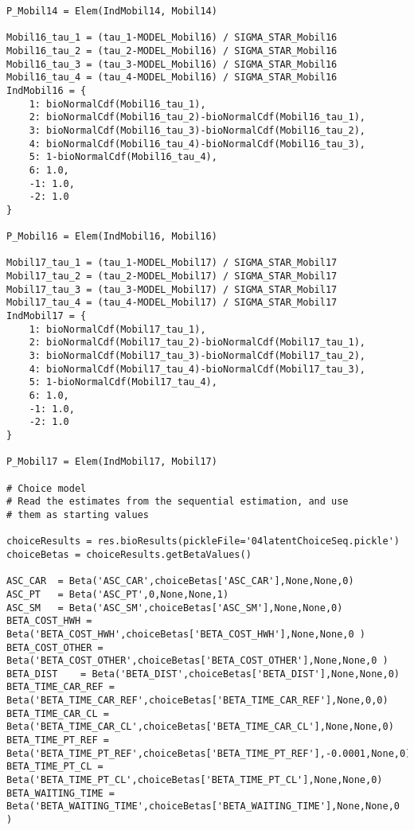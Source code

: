 \documentclass[12pt,a4paper]{article}
\begin{document}
\begin{lstlisting}[style=numbers]
P_Mobil14 = Elem(IndMobil14, Mobil14)

Mobil16_tau_1 = (tau_1-MODEL_Mobil16) / SIGMA_STAR_Mobil16
Mobil16_tau_2 = (tau_2-MODEL_Mobil16) / SIGMA_STAR_Mobil16
Mobil16_tau_3 = (tau_3-MODEL_Mobil16) / SIGMA_STAR_Mobil16
Mobil16_tau_4 = (tau_4-MODEL_Mobil16) / SIGMA_STAR_Mobil16
IndMobil16 = {
    1: bioNormalCdf(Mobil16_tau_1),
    2: bioNormalCdf(Mobil16_tau_2)-bioNormalCdf(Mobil16_tau_1),
    3: bioNormalCdf(Mobil16_tau_3)-bioNormalCdf(Mobil16_tau_2),
    4: bioNormalCdf(Mobil16_tau_4)-bioNormalCdf(Mobil16_tau_3),
    5: 1-bioNormalCdf(Mobil16_tau_4),
    6: 1.0,
    -1: 1.0,
    -2: 1.0
}

P_Mobil16 = Elem(IndMobil16, Mobil16)

Mobil17_tau_1 = (tau_1-MODEL_Mobil17) / SIGMA_STAR_Mobil17
Mobil17_tau_2 = (tau_2-MODEL_Mobil17) / SIGMA_STAR_Mobil17
Mobil17_tau_3 = (tau_3-MODEL_Mobil17) / SIGMA_STAR_Mobil17
Mobil17_tau_4 = (tau_4-MODEL_Mobil17) / SIGMA_STAR_Mobil17
IndMobil17 = {
    1: bioNormalCdf(Mobil17_tau_1),
    2: bioNormalCdf(Mobil17_tau_2)-bioNormalCdf(Mobil17_tau_1),
    3: bioNormalCdf(Mobil17_tau_3)-bioNormalCdf(Mobil17_tau_2),
    4: bioNormalCdf(Mobil17_tau_4)-bioNormalCdf(Mobil17_tau_3),
    5: 1-bioNormalCdf(Mobil17_tau_4),
    6: 1.0,
    -1: 1.0,
    -2: 1.0
}

P_Mobil17 = Elem(IndMobil17, Mobil17)

# Choice model
# Read the estimates from the sequential estimation, and use
# them as starting values

choiceResults = res.bioResults(pickleFile='04latentChoiceSeq.pickle')
choiceBetas = choiceResults.getBetaValues()

ASC_CAR	 = Beta('ASC_CAR',choiceBetas['ASC_CAR'],None,None,0)
ASC_PT	 = Beta('ASC_PT',0,None,None,1)
ASC_SM	 = Beta('ASC_SM',choiceBetas['ASC_SM'],None,None,0)
BETA_COST_HWH = Beta('BETA_COST_HWH',choiceBetas['BETA_COST_HWH'],None,None,0 )
BETA_COST_OTHER = Beta('BETA_COST_OTHER',choiceBetas['BETA_COST_OTHER'],None,None,0 )
BETA_DIST	 = Beta('BETA_DIST',choiceBetas['BETA_DIST'],None,None,0)
BETA_TIME_CAR_REF = Beta('BETA_TIME_CAR_REF',choiceBetas['BETA_TIME_CAR_REF'],None,0,0)
BETA_TIME_CAR_CL = Beta('BETA_TIME_CAR_CL',choiceBetas['BETA_TIME_CAR_CL'],None,None,0)
BETA_TIME_PT_REF = Beta('BETA_TIME_PT_REF',choiceBetas['BETA_TIME_PT_REF'],-0.0001,None,0)
BETA_TIME_PT_CL = Beta('BETA_TIME_PT_CL',choiceBetas['BETA_TIME_PT_CL'],None,None,0)
BETA_WAITING_TIME = Beta('BETA_WAITING_TIME',choiceBetas['BETA_WAITING_TIME'],None,None,0 )


\end{lstlisting}
\end{document}
